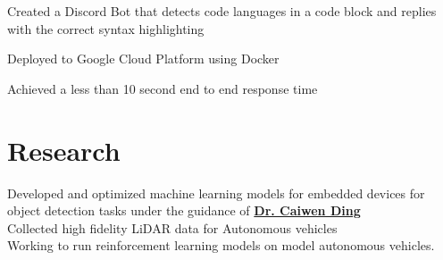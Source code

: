 \documentclass[]{resume-template}
\begin{document}
\begin{minipage}[t]{0.66\textwidth}
\begin{tightemize}
    \end{tightemize}
    \vspace{\topsep}

    \label{subsec:neatbot}
    \begin{tightemize}
        \item Created a Discord Bot that detects code languages in a code block and replies with the correct syntax highlighting
        \item Deployed to Google Cloud Platform using Docker
        \item Achieved a less than 10 second end to end response time
    \end{tightemize}




    \sectionsep{}



    \section{Research}\label{sec:research}
    \textbullet{} Developed and optimized machine learning models for embedded devices for object detection tasks under the guidance of \textbf{\href{https://caiwending.cse.uconn.edu/}{Dr. Caiwen Ding}} \\
    \textbullet{} Collected high fidelity LiDAR data for Autonomous vehicles \\
    \textbullet{} Working to run reinforcement learning models on model autonomous vehicles. \\



\end{minipage}
\end{document}
